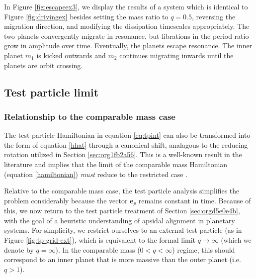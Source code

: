 \documentclass[usenatbib,twocolumn]{mnras}
\begin{document}
In Figure \ref{fig:escapeex3}, we display the results of a system which
is identical to Figure \ref{fig:drivingex} besides setting the mass
ratio to \(q=0.5\), reversing the migration direction, and modifying the
dissipation timescales appropriately.  The two planets convergently
migrate in resonance, but librations in the period ratio grow in
amplitude over time. Eventually, the planets escape resonance. The
inner planet \(m_1\) is kicked outwards and \(m_2\) continues migrating
inwards until the planets are orbit crossing.

\subsection{Test particle limit}
\label{sec:orga6d8485}
\subsubsection{Relationship to the comparable mass case}
\label{sec:org897c420}
The test particle Hamiltonian in equation \eqref{eq:tpint} can also
be transformed into the form of equation \eqref{hhat} through
a canonical shift, analagous to the reducing rotation utilized in 
Section \ref{sec:org1fb2a56}.
This is a well-known result in the literature
\citep[see e.g.][]{wisdom_canonical_1986,xu_migration_2018,deck_migration_2015,moutamid14_coupl_between_corot_lindb_reson}
and implies that the limit of the comparable mass Hamiltonian
(equation \eqref{hamiltonian}) \emph{must} reduce to the restricted case
\citep{deck13_first_order_reson_overl_stabil}.

Relative to the comparable mass case, the test particle
analysis simplifies the problem considerably because the vector
\(\mathbf{e}_p\) remains constant in time.
Because of this, we now return to the test particle treatment of
Section \ref{sec:orgd5e0e4b}, with the goal of a heuristic
understanding of apsidal alignment in planetary systems.
For simplicity, we restrict ourselves to an external test particle (as
in Figure \ref{fig:tp-grid-ext}), which is equivalent to the formal
limit \(q\to\infty\) (which we denote by \(q=\infty\)).
In the comparable mass (\(0<q<\infty\)) regime, this should correspond
to an inner planet that is more massive than the outer planet
(i.e. \(q>1\)).
\end{document}
